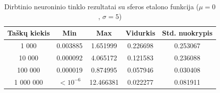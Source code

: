 \begin{table}[H]
    \centering
    \begin{tabular}{|c|c|c|c|c|}
        \hline
        \textbf{Taškų kiekis} & \textbf{Min} & \textbf{Max} & \textbf{Vidurkis} & \textbf{Std. nuokrypis} \\ \hline
        1 000        & 0.003885 & 1.651999 & 0.226698 & 0.253067 \\ \hline
        10 000       & 0.000092 & 4.065172 & 0.121583 & 0.236088 \\ \hline
        100 000      & 0.000019 & 0.874995 & 0.057946 & 0.030408 \\ \hline
        1 000 000    & $<10^{-6}$ & 12.466381 & 0.022277 & 0.081911 \\ \hline
    \end{tabular}
    \caption{Dirbtinio neuroninio tinklo rezultatai su sferos etalono funkcija ($\mu = 0$, $\sigma = 5$)}
\end{table}